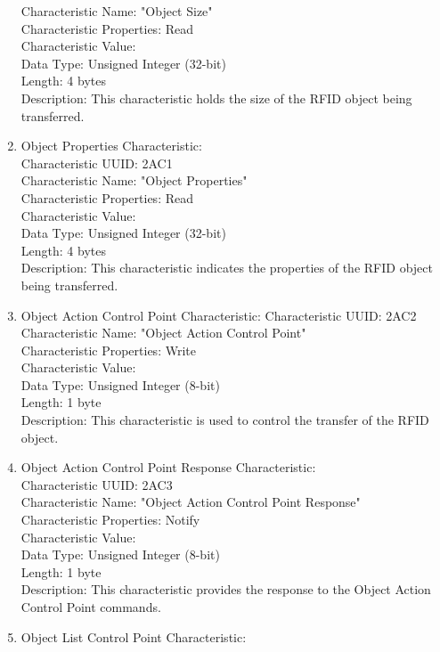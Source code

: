 \documentclass[a4paper,11pt]{article}%
\begin{document}
\begin{enumerate}
    Characteristic Name: "Object Size"\\
    Characteristic Properties: Read\\
    Characteristic Value:\\
    Data Type: Unsigned Integer (32-bit)\\
    Length: 4 bytes\\
    Description: This characteristic holds the size of the RFID object being transferred.\\
    \item Object Properties Characteristic:\\
    Characteristic UUID: 2AC1\\
    Characteristic Name: "Object Properties"\\
    Characteristic Properties: Read\\
    Characteristic Value:\\
    Data Type: Unsigned Integer (32-bit)\\
    Length: 4 bytes\\
    Description: This characteristic indicates the properties of the RFID object being transferred.
    \item Object Action Control Point Characteristic:
    Characteristic UUID: 2AC2\\
    Characteristic Name: "Object Action Control Point"\\
    Characteristic Properties: Write\\
    Characteristic Value:\\
    Data Type: Unsigned Integer (8-bit)\\
    Length: 1 byte\\
    Description: This characteristic is used to control the transfer of the RFID object.
    \item Object Action Control Point Response Characteristic:\\
    Characteristic UUID: 2AC3\\
    Characteristic Name: "Object Action Control Point Response"\\
    Characteristic Properties: Notify\\
    Characteristic Value:\\
    Data Type: Unsigned Integer (8-bit)\\
    Length: 1 byte\\
    Description: This characteristic provides the response to the Object Action Control Point commands.
    \item Object List Control Point Characteristic:\\

\end{enumerate}
\end{document}
